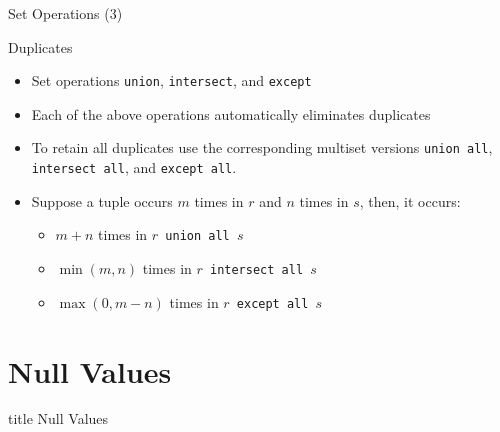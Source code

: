 \documentclass[aspectratio=169, xcolor=dvipsnames]{beamer}
\begin{document}
\begin{frame}{Set Operations (3)}
    \begin{block}{Duplicates}
        \begin{itemize}[<+->]
            \item Set operations \texttt{union}, \texttt{intersect}, and \texttt{except}
            \item Each of the above operations automatically eliminates duplicates
            \item To retain all duplicates use the corresponding multiset versions \texttt{union all}, \texttt{intersect all}, and \texttt{except all}.
            \item Suppose a tuple occurs $m$ times in $r$ and $n$ times in $s$, then, it occurs:
            \begin{itemize}
                \item[$\triangleright$] \textbf{$m + n$} times in \texttt{$r$ union all $s$}
                \item[$\triangleright$] \textbf{$\min(m, n)$} times in \texttt{$r$ intersect all $s$}
                \item[$\triangleright$] \textbf{$\max(0, m - n)$} times in \texttt{$r$ except all $s$}
            \end{itemize}
        \end{itemize}
    \end{block}
\end{frame}

\section{Null Values}

\begin{frame}
  \vfill
  \centering
  \begin{beamercolorbox}[sep=8pt,center,shadow=true,rounded=true]{title}
    Null Values\par%
  \end{beamercolorbox}
  \vfill
\end{frame}
\end{document}
